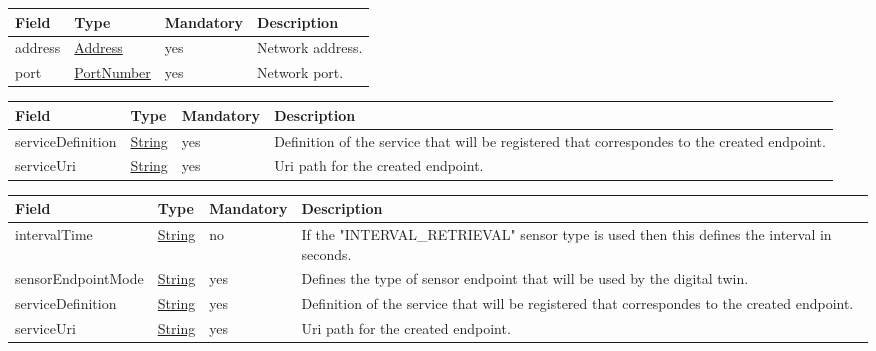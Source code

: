 \documentclass[a4paper]{arrowhead}
\newcommand{\pref}[1]{{\textcolor{ArrowheadGrey}{\hyperref[sec:model:primitives:#1]{#1}}}}
\begin{document}
\begin{table}[H]
\begin{tabularx}{\textwidth}{| p{4.25cm} | p{3.5cm} | p{2cm} | X |} \hline
\rowcolor{gray!33} Field & Type & Mandatory & Description \\ \hline
address & \pref{Address} & yes & Network address. \\ \hline
port & \pref{PortNumber} & yes & Network port. \\ \hline
\end{tabularx}
\end{table}

\label{sec:model:ControlCommand}
 
\begin{table}[H]
\begin{tabularx}{\textwidth}{| p{4.25cm} | p{3.5cm} | p{2cm} | X |} \hline
\rowcolor{gray!33} Field & Type & Mandatory & Description \\ \hline
serviceDefinition & \pref{String} & yes & Definition of the service that will be registered that correspondes to the created endpoint. \\ \hline
serviceUri & \pref{String} & yes & Uri path for the created endpoint.\\ \hline
\end{tabularx}
\end{table}

\label{sec:model:SensedProperty}
 
\begin{table}[H]
\begin{tabularx}{\textwidth}{| p{4.25cm} | p{3.5cm} | p{2cm} | X |} \hline
\rowcolor{gray!33} Field & Type & Mandatory & Description \\ \hline
intervalTime & \pref{String} & no & If the "INTERVAL\_RETRIEVAL" sensor type is used then this defines the interval in seconds. \\ \hline
sensorEndpointMode & \pref{String} & yes & Defines the type of sensor endpoint that will be used by the digital twin.\\ \hline
serviceDefinition & \pref{String} & yes & Definition of the service that will be registered that correspondes to the created endpoint. \\ \hline
serviceUri & \pref{String} & yes & Uri path for the created endpoint.\\ \hline
\end{tabularx}
\end{table}
\end{document}
